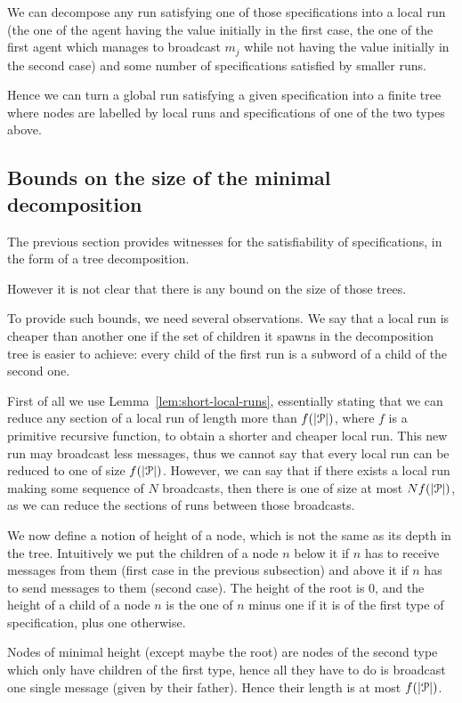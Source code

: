 We can decompose any run satisfying one of those specifications into a local run (the one of the agent having the value initially in the first case, the one of the first agent which manages to broadcast $m_j$ while not having the value initially in the second case) and some number of specifications satisfied by smaller runs.

Hence we can turn a global run satisfying a given specification into a finite tree where nodes are labelled by local runs and specifications of one of the two types above.

\subsection{Bounds on the size of the minimal decomposition}

The previous section provides witnesses for the satisfiability of specifications, in the form of a tree decomposition.

However it is not clear that there is any bound on the size of those trees.

To provide such bounds, we need several observations.
We say that a local run is cheaper than another one if the set of children it spawns in the decomposition tree is easier to achieve: every child of the first run is a subword of a child of the second one.

 First of all we use Lemma~\ref{lem:short-local-runs}, essentially stating that we can reduce any section of a local run of length more than $f(|\mathcal{P}|)$, where $f$ is a primitive recursive function, to obtain a shorter and cheaper local run.
 This new run may broadcast less messages, thus we cannot say that every local run can be reduced to one of size $f(|\mathcal{P}|)$.
 However, we can say that if there exists a local run making some sequence of $N$ broadcasts, then there is one of size at most $Nf(|\mathcal{P}|)$, as we can reduce the sections of runs between those broadcasts.
 
 We now define a notion of height of a node, which is not the same as its depth in the tree. Intuitively we put the children of a node $n$ below it if $n$ has to receive messages from them (first case in the previous subsection) and above it if $n$ has to send messages to them (second case).
 The height of the root is $0$, and the height of a child of a node $n$  is  the one of $n$ minus one if it is of the first type of specification, plus one otherwise.
 
 Nodes of minimal height (except maybe the root) are nodes of the second type which only have children of the first type, hence all they have to do is broadcast one single message (given by their father). Hence their length is at most $f(|\mathcal{P}|)$. 
 
